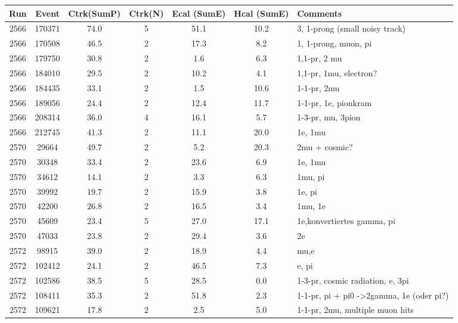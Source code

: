 \begin{tabular}{ccccccl}
	\toprule
	Run & Event & Ctrk(SumP) & Ctrk(N) & Ecal (SumE) & Hcal (SumE) & Comments \\
	\midrule
	2566 & 170371 & 74.0 & 5 & 51.1 & 10.2 & 3, 1-prong (small noisy track)               \\
	2566 & 170508 & 46.5 & 2 & 17.3 & 8.2  & 1, 1-prong, muon, pi                                 \\
	2566 & 179750 & 30.8 & 2 & 1.6  & 6.3  & 1,1-pr, 2 mu                                \\
	2566 & 184010 & 29.5 & 2 & 10.2 & 4.1  & 1,1-pr, 1mu, electron?                               \\
	2566 & 184435 & 33.1 & 2 & 1.5  & 10.6 & 1-1-pr, 2mu                                          \\
	2566 & 189056 & 24.4 & 2 & 12.4 & 11.7 & 1-1-pr, 1e, pionkram                                 \\
	2566 & 208314 & 36.0 & 4 & 16.1 & 5.7  & 1-3-pr, mu, 3pion                                    \\
	2566 & 212745 & 41.3 & 2 & 11.1 & 20.0 & 1e, 1mu                                              \\
	2570 & 29664  & 49.7 & 2 & 5.2  & 20.3 & 2mu + cosmic?                                        \\
	2570 & 30348  & 33.4 & 2 & 23.6 & 6.9  & 1e, 1mu                                              \\
	2570 & 34612  & 14.1 & 2 & 3.3  & 6.3  & 1mu, pi                                              \\
	2570 & 39992  & 19.7 & 2 & 15.9 & 3.8  & 1e, pi                                               \\
	2570 & 42200  & 26.8 & 2 & 16.5 & 3.4  & 1mu, 1e                                              \\
	2570 & 45609  & 23.4 & 5 & 27.0 & 17.1 & 1e,konvertiertes gamma, pi                           \\
	2570 & 47033  & 23.8 & 2 & 29.4 & 3.6  & 2e                                                   \\
	2572 & 98915  & 39.0 & 2 & 18.9 & 4.4  & mu,e                                                 \\
	2572 & 102412 & 24.1 & 2 & 46.5 & 7.3  & e, pi                                                \\
	2572 & 102586 & 38.5 & 5 & 28.5 & 0.0  & 1-3-pr, cosmic radiation, e, 3pi                     \\
	2572 & 108411 & 35.3 & 2 & 51.8 & 2.3  & 1-1-pr, pi + pi0 -\textgreater 2gamma, 1e (oder pi?) \\
	2572 & 109621 & 17.8 & 2 & 2.5  & 5.0  & 1-1-pr, 2mu, multiple muon hits   \\
	\bottomrule
\end{tabular}